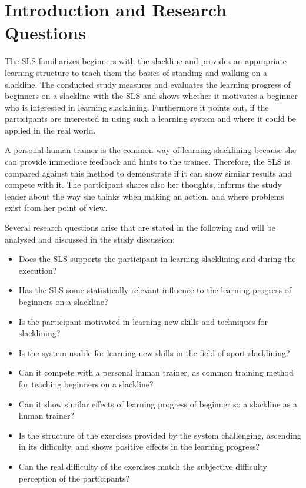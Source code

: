 \section{Introduction and Research Questions}\label{6_introduction}
The SLS familiarizes beginners with the slackline and provides an appropriate learning structure to teach them the basics of standing and walking on a slackline.
The conducted study measures and evaluates the learning progress of beginners on a slackline with the SLS and shows whether it motivates a beginner who is interested in learning slacklining.
Furthermore it points out, if the participants are interested in using such a learning system and where it could be applied in the real world.

A personal human trainer is the common way of learning slacklining because she can provide immediate feedback and hints to the trainee.
Therefore, the SLS is compared against this method to demonstrate if it can show similar results and compete with it.
The participant shares also her thoughts, informs the study leader about the way she thinks when making an action, and where problems exist from her point of view.

Several research questions arise that are stated in the following and will be analysed and discussed in the study discussion:

\begin{itemize}
\item Does the SLS supports the participant in learning slacklining and during the execution?
\item Has the SLS some statistically relevant influence to the learning progress of beginners on a slackline?
\item Is the participant motivated in learning new skills and techniques for slacklining?
\item Is the system usable for learning new skills in the field of sport slacklining?
\item Can it compete with a personal human trainer, as common training method for teaching beginners on a slackline?
\item Can it show similar effects of learning progress of beginner so a slackline as a human trainer? 
\item Is the structure of the exercises provided by the system challenging, ascending in its difficulty, and shows positive effects in the learning progress?
\item Can the real difficulty of the exercises match the subjective difficulty perception of the participants?
\end{itemize}
